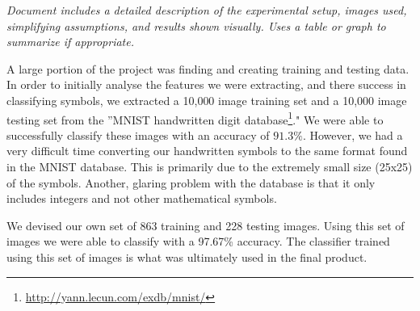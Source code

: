\textit{Document includes a detailed description of the experimental setup, images used, simplifying assumptions, and results shown visually. Uses a table or graph to summarize if appropriate.}

A large portion of the project was finding and creating training and testing data. In order to initially analyse the features we were extracting, and there success in classifying symbols, we extracted a 10,000 image training set and a 10,000 image testing set from the  ''MNIST handwritten digit database\footnote{\url{http://yann.lecun.com/exdb/mnist/}}." We were able to successfully classify these images with an accuracy of $91.3\%$. However, we had a very difficult time converting our handwritten symbols to the same format found in the MNIST database. This is primarily due to the extremely small size (25x25) of the symbols. Another, glaring problem with the database is that it only includes integers and not other mathematical symbols.

We devised our own set of 863 training and 228 testing images. Using this set of images we were able to classify with a 97.67\% accuracy. The classifier trained using this set of images is what was ultimately used in the final product.